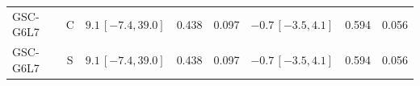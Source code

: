 \documentclass[10pt,a4paper]{article}
\begin{document}
\begin{longtable}{lcp{37mm}rrp{37mm}rr}
GSC-G6L7 & C & \(9.1\,[-7.4,39.0]\) & 0.438 & 0.097 & \(-0.7\,[-3.5,4.1]\) & 0.594 & 0.056\\
GSC-G6L7 & S & \(9.1\,[-7.4,39.0]\) & 0.438 & 0.097 & \(-0.7\,[-3.5,4.1]\) & 0.594 & 0.056\\

\end{longtable}
\end{document}
